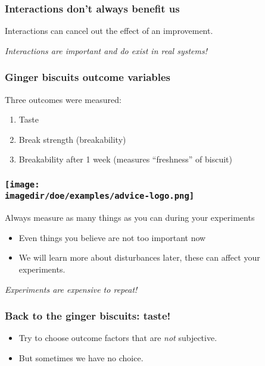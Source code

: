 \begin{frame}\frametitle{Interactions don't always benefit us}
	
	Interactions can cancel out the effect of an improvement. 
	
	\vspace{24pt}
	{\color{myOrange} 	\emph{Interactions are important and do exist in real systems!}}
\end{frame}

\begin{frame}\frametitle{Ginger biscuits outcome variables}
	Three outcomes were measured:
	\begin{enumerate}
		\item	Taste		
		\item	Break strength (breakability)
		\item	Breakability after 1 week (measures ``freshness'' of biscuit)
	\end{enumerate}
\end{frame}

\begin{frame}\frametitle{\texttt{[image: \\imagedir/doe/examples/advice-logo.png]}}
	\begin{exampleblock}{Always measure as many things as you can during your experiments}
		\begin{itemize}
			\item	Even things you believe are not too important now
			\item	We will learn more about disturbances later, these can affect your experiments.
		\end{itemize}
	\end{exampleblock}
	\vspace{24pt}\pause
	{\color{myOrange} 	\emph{Experiments are expensive to repeat!}}
\end{frame}

\begin{frame}\frametitle{Back to the ginger biscuits: taste!}
	\begin{itemize}
		\item	Try to choose outcome factors that are \emph{not} subjective.
		\item	But sometimes we have no choice.
	\end{itemize}
\end{frame}

